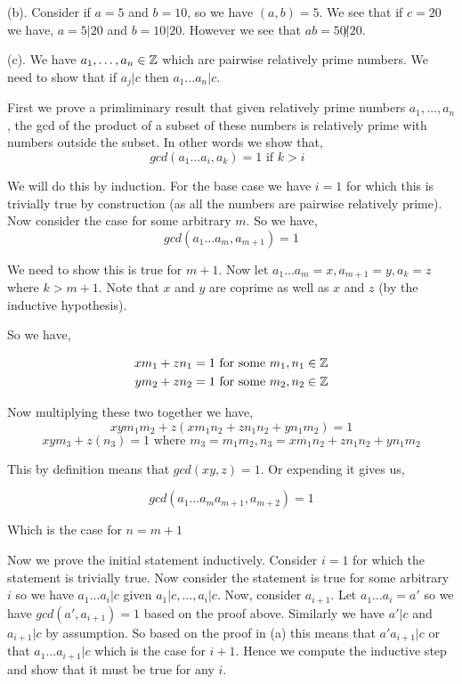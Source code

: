 \documentclass[12pt]{exam}
\begin{document}
\begin{questions}
(b). Consider if $a = 5$ and  $b = 10$, so we have  $(a, b) = 5$.  We see that if $c = 20$ we have, $a = 5 | 20$ and  $b = 10 | 20$. However we see that $ab = 50 \not | 20$.


(c). We have $a_1, \dots, a_n \in \mathbb{Z}$ which are pairwise relatively prime numbers. We need to show that if $a_j | c$ then  $a_1\dots a_n | c$.

First we prove a primliminary result that given relatively prime numbers $a_1,\dots,a_n$, the gcd of the product of a subset of these numbers is relatively prime with numbers outside the subset. In other words we show that, 
$$ gcd(a_1\dots a_i, a_k) = 1 \text{ if $k > i$ } $$ 


We will do this by induction. For the base case we have $i = 1$  for which this is trivially true by construction (as all the numbers are pairwise relatively prime). Now consider the case for some arbitrary $m$. So we have,  
$$ gcd(a_1 \dots a_m, a_{m + 1}) = 1 $$ 

We need to show this is true for $m + 1$. Now let  $a_1 \dots a_m = x, a_{m + 1} = y, a_{k} = z$ where $k > m + 1$. Note that $x$ and  $y$ are coprime as well as $x$ and $z$ (by the inductive hypothesis).

So we have,

\begin{align*}
    xm_1 + zn_1 &= 1 \text{ for some $m_1,n_1 \in \mathbb{Z}$}\\
    ym_2 + zn_2 &= 1\text{ for some $m_2,n_2 \in \mathbb{Z}$}\\
\end{align*}

Now multiplying these two together we have, 
$$ xym_1m_2 + z(xm_1n_2 + zn_1n_2 + yn_1m_2) = 1 $$ 
$$ xym_3 + z(n_3) = 1 \text{ where $m_3 = m_1m_2, n_3 = xm_1n_2 + zn_1n_2 + yn_1m_2$} $$ 

This by definition means that $gcd(xy, z) = 1$. Or expending it gives us,

$$ gcd(a_1\dots a_{m}a_{m + 1}, a_{m + 2}) = 1 $$ 


Which is the case for $n = m + 1$


Now we prove the initial statement inductively.  Consider  $i = 1$ for which the statement is trivially true. Now consider the statement is true for some arbitrary $i$  so we have  $a_1\dots a_i | c$ given $a_1 | c,\dots,a_i | c$. Now, consider $a_{i + 1}$. Let $a_1 \dots a_i = a'$ so we have  $gcd(a', a_{i + 1}) = 1$ based on the proof above. Similarly we have $a' | c$ and $a_{i + 1} | c$ by assumption. So based on the proof in (a) this means that $a' a_{i + 1}| c$ or that $a_1 \dots a_{i + 1} | c$ which is the case for $i + 1$. Hence we compute the inductive step and show that it must be true for any  $i$.




\end{questions}
\end{document}

